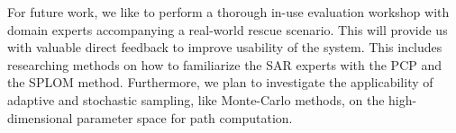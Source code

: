 \documentclass{egpubl}
\begin{document}
For future work, we like to perform a thorough in-use evaluation workshop with domain experts accompanying a real-world rescue scenario. This will provide us with valuable direct feedback to improve usability of the system. This includes researching methods on how to familiarize the SAR experts with the PCP and the SPLOM method. Furthermore, we plan to investigate the applicability of adaptive and stochastic sampling, like Monte-Carlo methods, on the high-dimensional parameter space for path computation.





\end{document}
